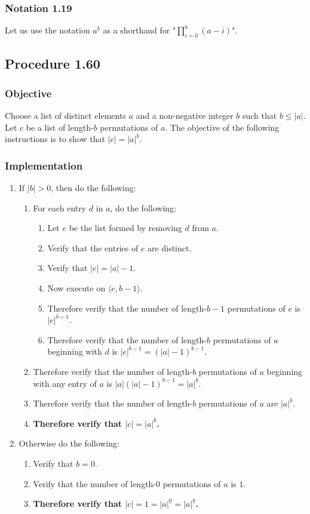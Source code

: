 \documentclass[twocolumn]{article}
\newcommand{\ul}[1]{\underline{#1}}
\newcommand{\notation}[1]{\subsubsection*{Notation #1}}
\newcommand{\procedure}[2][]{\subsection*{Procedure #2 \ifthenelse{\equal{#1}{}}{}{(#1)}}\label{sec:procedure #2}}
\newcommand{\objective}{\subsubsection*{Objective}}
\newcommand{\implementation}{\subsubsection*{Implementation}}
\newcommand{\procedurehr}[2][]{\hyperref[sec:procedure #2]{\ifthenelse{\equal{#1}{}}{procedure #2}{#1}}}
\begin{document}
		\notation{1.19}
			Let us use the notation $a^{\ul{b}}$ as a shorthand for "$\prod_{i=0}^b(a-i)$".
		\procedure{1.60}
			\objective
				Choose a list of distinct elements $a$ and a non-negative integer $b$ such that $b\le\lvert a\rvert$. Let $c$ be a list of length-$b$ permutations of $a$. The objective of the following instructions is to show that $\lvert c\rvert=\lvert a\rvert^{\ul{b}}$.
			\implementation
				\begin{enumerate}
					\item If $\lvert b\rvert>0$, then do the following:
					\begin{enumerate}
						\item For each entry $d$ in $a$, do the following:
						\begin{enumerate}
							\item Let $e$ be the list formed by removing $d$ from $a$.
							\item Verify that the entries of $e$ are distinct.
							\item Verify that $\lvert e\rvert=\lvert a\rvert-1$.
							\item Now execute \procedurehr{1.60} on $\langle e,b-1\rangle$.
							\item Therefore verify that the number of length-$b-1$ permutations of $e$ is $\lvert e\rvert^{\ul{b-1}}$.
							\item Therefore verify that the number of length-$b$ permutations of $a$ beginning with $d$ is $\lvert e\rvert^{\ul{b-1}}=(\lvert a\rvert-1)^{\ul{b-1}}$.
						\end{enumerate}
						\item Therefore verify that the number of length-$b$ permutations of $a$ beginning with any entry of $a$ is $\lvert a\rvert(\lvert a\rvert-1)^{\ul{b-1}}=\lvert a\rvert^{\ul{b}}$.
						\item Therefore verify that the number of length-$b$ permutations of $a$ are $\lvert a\rvert^{\ul{b}}$.
						\item \textbf{Therefore verify that $\lvert c\rvert=\lvert a\rvert^{\ul{b}}$.}
					\end{enumerate}
					\item Otherwise do the following:
					\begin{enumerate}
						\item Verify that $b=0$.
						\item Verify that the number of length-$0$ permutations of $a$ is $1$.
						\item \textbf{Therefore verify that $\lvert c\rvert=1=\lvert a\rvert^{\ul{0}}=\lvert a\rvert^{\ul{b}}$.}
					\end{enumerate}
				\end{enumerate}
\end{document}
